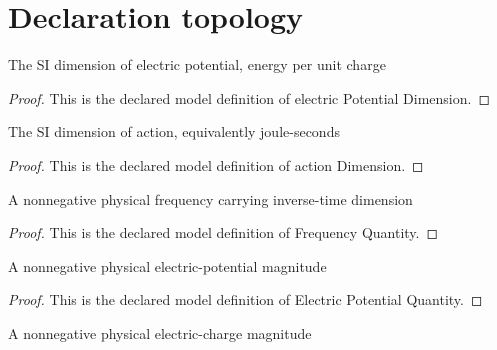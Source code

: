 \section{Declaration topology}
\begin{definition}
  \label{def:physics:phyx-mini-0499:phyxminiproblems-problemphyxmini0499-electricpotentialdimension}
  The SI dimension of electric potential, energy per unit charge
\end{definition}
\begin{proof}
  This is the declared model definition of electric Potential Dimension.
\end{proof}
\begin{definition}
  \label{def:physics:phyx-mini-0499:phyxminiproblems-problemphyxmini0499-actiondimension}
  The SI dimension of action, equivalently joule-seconds
\end{definition}
\begin{proof}
  This is the declared model definition of action Dimension.
\end{proof}
\begin{definition}
  \label{def:physics:phyx-mini-0499:phyxminiproblems-problemphyxmini0499-frequencyquantity}
  A nonnegative physical frequency carrying inverse-time dimension
\end{definition}
\begin{proof}
  This is the declared model definition of Frequency Quantity.
\end{proof}
\begin{definition}
  \label{def:physics:phyx-mini-0499:phyxminiproblems-problemphyxmini0499-electricpotentialquantity}
  A nonnegative physical electric-potential magnitude
\end{definition}
\begin{proof}
  This is the declared model definition of Electric Potential Quantity.
\end{proof}
\begin{definition}
  \label{def:physics:phyx-mini-0499:phyxminiproblems-problemphyxmini0499-chargemagnitudequantity}
  A nonnegative physical electric-charge magnitude
\end{definition}
